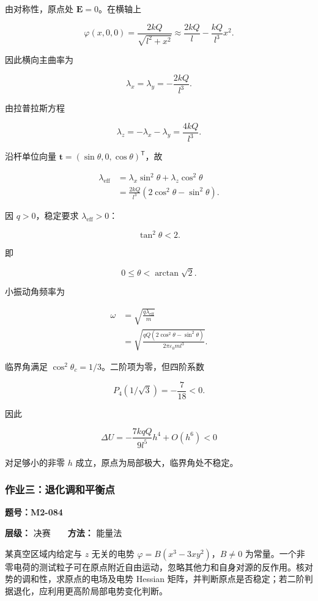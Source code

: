 由对称性，原点处 \(\mathbf E=0\)。在横轴上

\[
\varphi(x,0,0)
=\frac{2kQ}{\sqrt{l^2+x^2}}
\approx\frac{2kQ}{l}-\frac{kQ}{l^3}x^2.
\]

因此横向主曲率为

\[
\lambda_x=\lambda_y=-\frac{2kQ}{l^3}.
\]

由拉普拉斯方程

\[
\lambda_z=-\lambda_x-\lambda_y
=\frac{4kQ}{l^3}.
\]

沿杆单位向量 \(\mathbf t=(\sin\theta,0,\cos\theta)^{\mathsf T}\)，故

\[
\begin{aligned}
\lambda_{\mathrm{eff}}
&=\lambda_x\sin^2\theta
+\lambda_z\cos^2\theta\\
&=\frac{2kQ}{l^3}
(2\cos^2\theta-\sin^2\theta).
\end{aligned}
\]

因 \(q>0\)，稳定要求 \(\lambda_{\mathrm{eff}}>0\)：

\[
\boxed{\tan^2\theta<2.}
\]

即

\[
\boxed{0\le\theta<\arctan\sqrt2.}
\]

小振动角频率为

\[
\begin{aligned}
\omega
&=\sqrt{\frac{q\lambda_{\mathrm{eff}}}{m}}\\
&=\boxed{
\sqrt{
\frac{qQ(2\cos^2\theta-\sin^2\theta)}
{2\pi\varepsilon_0ml^3}}}.
\end{aligned}
\]

临界角满足 \(\cos^2\theta_c=1/3\)。二阶项为零，但四阶系数

\[
P_4(1/\sqrt3)=-\frac7{18}<0.
\]

因此

\[
\Delta U
=-\frac{7kqQ}{9l^5}h^4+O(h^6)<0
\]

对足够小的非零 \(h\) 成立，原点为局部极大，临界角处不稳定。

\subsubsection{作业三：退化调和平衡点}\label{m2:ux4f5cux4e1aux4e09ux9000ux5316ux8c03ux548cux5e73ux8861ux70b9}

\textbf{题号：M2-084}

\textbf{层级：} 决赛　　\textbf{方法：} 能量法

某真空区域内给定与 \(z\) 无关的电势 \(\varphi=B(x^3-3xy^2)\)，\(B\ne0\)
为常量。一个非零电荷的测试粒子可在原点附近自由运动，忽略其他力和自身对源的反作用。核对势的调和性，求原点的电场及电势
Hessian
矩阵，并判断原点是否稳定；若二阶判据退化，应利用更高阶局部电势变化判断。

